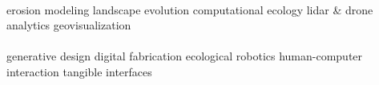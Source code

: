 \documentclass[]{baharmon_cv}
\begin{document}
\vspace*{0.3cm}
 \\ \vspace*{0.1cm}
\normalsize{
erosion modeling
\textbullet{}
landscape evolution
\textbullet{}
computational ecology 
\textbullet{}
lidar \& drone analytics
\textbullet{}
geovisualization
}
\\

 \vspace{0.1em} \\ \vspace*{0.1cm}
\normalsize{
generative design
\textbullet{}
digital fabrication
\textbullet{}
ecological robotics
\textbullet{}
human-computer interaction
\textbullet{}
tangible interfaces
}
\\


\sectiondivider


\end{document}
